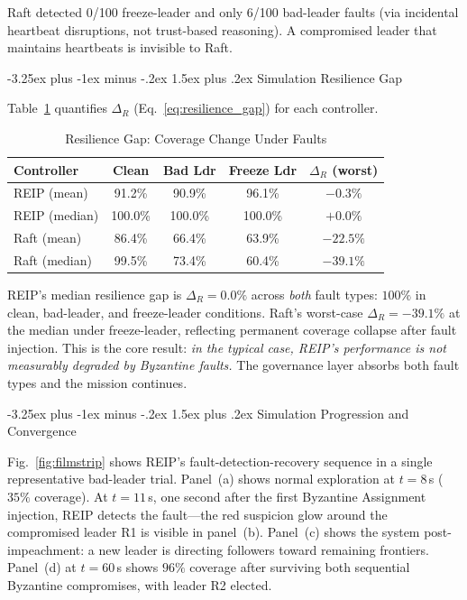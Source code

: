 \documentclass[conference]{IEEEtran}
\makeatletter
\renewcommand{\subsection}{\@startsection{subsection}{2}{\z@}%
  {-3.25ex plus -1ex minus -.2ex}%
  {1.5ex plus .2ex}%
  {\normalfont\normalsize\itshape\centering}}
\makeatother
\begin{document}
Raft detected 0/100 freeze-leader and only 6/100 bad-leader faults (via incidental heartbeat disruptions, not trust-based reasoning). A compromised leader that maintains heartbeats is invisible to Raft.

\subsection{Simulation Resilience Gap}

Table~\ref{tab:mr_resilience} quantifies $\Delta_R$ (Eq.~\ref{eq:resilience_gap}) for each controller.

\begin{table}[t]
\centering
\caption{Resilience Gap: Coverage Change Under Faults}
\label{tab:mr_resilience}
\begin{tabular}{@{}lcccc@{}}
\toprule
\textbf{Controller} & \textbf{Clean} & \textbf{Bad Ldr} &
\textbf{Freeze Ldr} & $\Delta_R$ (worst) \\
\midrule
REIP (mean)    & 91.2\%  & 90.9\%  & 96.1\%  & $-0.3\%$  \\
REIP (median)  & 100.0\% & 100.0\% & 100.0\% & $+0.0\%$  \\
\midrule
Raft (mean)    & 86.4\%  & 66.4\%  & 63.9\%  & $-22.5\%$ \\
Raft (median)  & 99.5\%  & 73.4\%  & 60.4\%  & $-39.1\%$ \\
\bottomrule
\end{tabular}
\end{table}

REIP's median resilience gap is $\Delta_R = 0.0\%$ across \emph{both} fault types: $100\%$ in clean, bad-leader, and freeze-leader conditions. Raft's worst-case $\Delta_R = -39.1\%$ at the median under freeze-leader, reflecting permanent coverage collapse after fault injection. This is the core result: \emph{in the typical case, REIP's performance is not measurably degraded by Byzantine faults.} The governance layer absorbs both fault types and the mission continues.

\subsection{Simulation Progression and Convergence}

Fig.~\ref{fig:filmstrip} shows REIP's fault-detection-recovery sequence in a single representative bad-leader trial. Panel~(a) shows normal exploration at $t{=}8\,$s ($35\%$ coverage). At $t{=}11\,$s, one second after the first Byzantine Assignment injection, REIP detects the fault---the red suspicion glow around the compromised leader R1 is visible in panel~(b). Panel~(c) shows the system post-impeachment: a new leader is directing followers toward remaining frontiers. Panel~(d) at $t{=}60\,$s shows $96\%$ coverage after surviving both sequential Byzantine compromises, with leader R2 elected.
\end{document}
